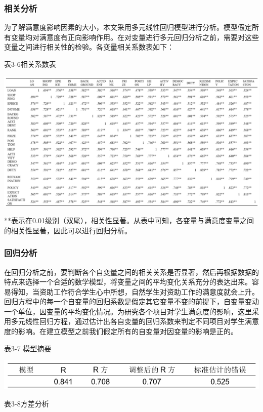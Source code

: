 \documentclass[UTF8,a4paper,12pt]{ctexart}  %
\begin{document}
\hypertarget{section-29}{%
\subsubsection{相关分析}\label{section-29}}

为了解满意度影响因素的大小，本文采用多元线性回归模型进行分析。模型假定所有变量均对满意度有正向影响作用。在对变量进行多元回归分析之前，需要对这些变量之间进行相关性的检验。各变量相关系数表如下：

表3-6相关系数表

\includegraphics{idr.png}

**表示在0.01级别（双尾），相关性显著。从表中可知，各变量与满意度变量之间的相关性显著，因此可以进行回归分析。

\hypertarget{section-30}{%
\subsubsection{回归分析}\label{section-30}}

在回归分析之前，要判断各个自变量之间的相关关系是否显著，然后再根据数据的特点来选择一个合适的数学模型，将变量之间的平均变化关系充分的表达出来。容易得知，当资助工作符合学生心中所想，自然学生对资助工作的满意度就会上升。回归方程中的每一个自变量的回归系数是假定其它变量不变的前提下，自变量变动一个单位，因变量的平均变化情况。为研究各个项目对学生满意度的影响，这里采用多元线性回归方程，通过估计出各自变量的回归系数来判定不同项目对学生满意度的影响。在建立模型之前我们假定所有的自变量对因变量的影响是正的。

表3-7 模型摘要

\includegraphics{id3_7.png}

表3-8方差分析
\end{document}
